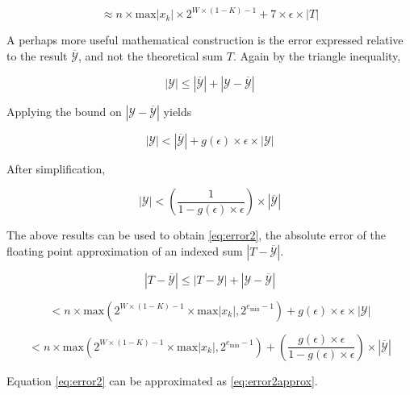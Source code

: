 \documentclass[12pt]{article}
\providecommand{\min}{\ensuremath{\text{min}}}
\providecommand{\max}{\ensuremath{\text{max}}}
\theoremstyle{definition}
\numberwithin{equation}{section}
\numberwithin{figure}{section}
\begin{document}
    \begin{equation}
    \approx n \times \max|x_k|\times 2^{W \times (1 - K) - 1} + 7 \times \epsilon \times|T|
      \label{eq:errorapprox}
    \end{equation}

    A perhaps more useful mathematical construction is the error expressed relative to the result $\overline{\mathcal{Y}}$, and not the theoretical sum $T$. Again by the triangle inequality,

    \begin{equation*}
      |\mathcal{Y}| \leq |\overline{\mathcal{Y}}| + |\mathcal{Y} - \overline{\mathcal{Y}}|
    \end{equation*}

    Applying the bound on $|\mathcal{Y} - \overline{\mathcal{Y}}|$ yields

    \begin{equation*}
      |\mathcal{Y}| < |\overline{\mathcal{Y}}| + g(\epsilon)\times\epsilon\times|\mathcal{Y}|
    \end{equation*}

    After simplification,

    \begin{equation*}
      |\mathcal{Y}| < (\frac{1}{1 - g(\epsilon)\times\epsilon}) \times |\overline{\mathcal{Y}}|
    \end{equation*}

    The above results can be used to obtain  \eqref{eq:error2}, the absolute error of the floating point approximation of an indexed sum $|T - \overline{\mathcal{Y}}|$.

    \begin{equation*}
      |T - \overline{\mathcal{Y}}| \leq |T - \mathcal{Y}| + |\mathcal{Y} - \overline{\mathcal{Y}}|
    \end{equation*}

    \begin{equation*}
      < n \times \max(2^{W \times (1 - K) - 1} \times \max|x_k|, 2^{e_{\min} - 1}) + g(\epsilon)\times\epsilon\times|\mathcal{Y}|
    \end{equation*}

    \begin{equation}
      < n \times \max(2^{W \times (1 - K) - 1} \times \max|x_k|, 2^{e_{\min} - 1}) + (\frac{g(\epsilon)\times\epsilon}{1 - g(\epsilon)\times\epsilon}) \times |\overline{\mathcal{Y}}|
      \label{eq:error2}
    \end{equation}

    Equation \eqref{eq:error2} can be approximated as  \eqref{eq:error2approx}.
\end{document}
